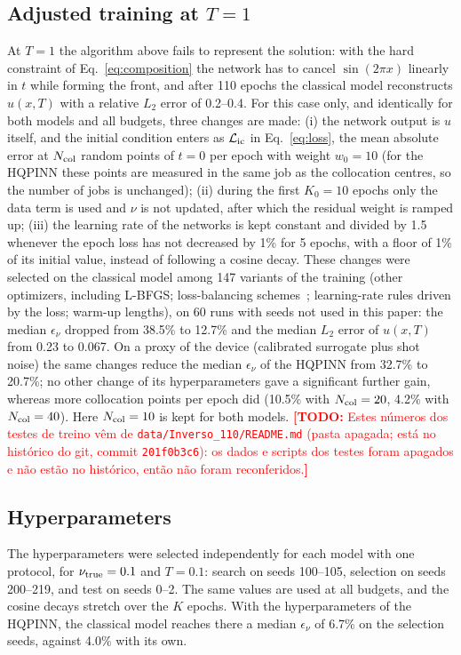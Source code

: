 \documentclass[floatfix,aps,pra,twocolumn,superscriptaddress,10pt,nofootinbib]{revtex4-2}
\newif\ifshowtodos \showtodostrue
\newcommand{\TODO}[1]{\ifshowtodos\textcolor{red}{\textbf{[TODO:} #1\textbf{]}}\fi}
\newcommand{\Ncol}{N_{\rm col}}
\newcounter{algorithm}
\begin{document}
\begin{appendices}
\subsection{Adjusted training at \texorpdfstring{$T=1$}{T=1}}\label{app:adjust}
At $T=1$ the algorithm above fails to represent the solution: with the hard constraint of Eq.~\eqref{eq:composition} the network has to cancel $\sin(2\pi x)$ linearly in $t$ while forming the front, and after 110 epochs the classical model reconstructs $u(x,T)$ with a relative $L_2$ error of 0.2--0.4. For this case only, and identically for both models and all budgets, three changes are made: (i) the network output is $u$ itself, and the initial condition enters as $\mathcal L_{\rm ic}$ in Eq.~\eqref{eq:loss}, the mean absolute error at $\Ncol$ random points of $t=0$ per epoch with weight $w_0=10$ (for the HQPINN these points are measured in the same job as the collocation centres, so the number of jobs is unchanged); (ii) during the first $K_0=10$ epochs only the data term is used and $\nu$ is not updated, after which the residual weight is ramped up; (iii) the learning rate of the networks is kept constant and divided by 1.5 whenever the epoch loss has not decreased by 1\% for 5 epochs, with a floor of 1\% of its initial value, instead of following a cosine decay. These changes were selected on the classical model among 147 variants of the training (other optimizers, including L-BFGS; loss-balancing schemes~\cite{wang2021understanding}; learning-rate rules driven by the loss; warm-up lengths), on 60 runs with seeds not used in this paper: the median $\epsilon_\nu$ dropped from 38.5\% to 12.7\% and the median $L_2$ error of $u(x,T)$ from 0.23 to 0.067. On a proxy of the device (calibrated surrogate plus shot noise) the same changes reduce the median $\epsilon_\nu$ of the HQPINN from 32.7\% to 20.7\%; no other change of its hyperparameters gave a significant further gain, whereas more collocation points per epoch did (10.5\% with $\Ncol=20$, 4.2\% with $\Ncol=40$). Here $\Ncol=10$ is kept for both models. \TODO{Estes n\'umeros dos testes de treino v\^em de \texttt{data/Inverso\_110/README.md} (pasta apagada; est\'a no hist\'orico do git, commit \texttt{201f0b3c6}): os dados e scripts dos testes foram apagados e n\~ao est\~ao no hist\'orico, ent\~ao n\~ao foram reconferidos.}

\subsection{Hyperparameters}\label{app:ihyper}
The hyperparameters were selected independently for each model with one protocol, for $\nu_{\rm true}=0.1$ and $T=0.1$: search on seeds 100--105, selection on seeds 200--219, and test on seeds 0--2. The same values are used at all budgets, and the cosine decays stretch over the $K$ epochs. With the hyperparameters of the HQPINN, the classical model reaches there a median $\epsilon_\nu$ of 6.7\% on the selection seeds, against 4.0\% with its own.


\end{appendices}
\end{document}
